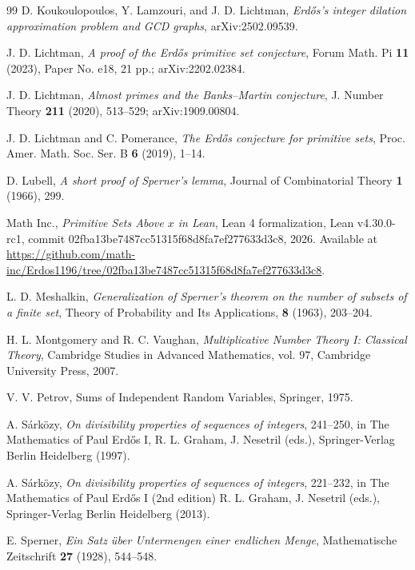 \documentclass[12pt]{amsart}
\theoremstyle{definition}
\theoremstyle{remark}
\numberwithin{equation}{section}
\newcommand{\1}{{\mathbf 1}}
\newcommand{\Erdos}{{Erd\H{o}s}}
\begin{document}
\begin{thebibliography}{99}
D. Koukoulopoulos, Y. Lamzouri, and J. D. Lichtman, \emph{\Erdos{}'s integer dilation approximation problem and GCD graphs}, arXiv:2502.09539.


J. D. Lichtman,
\emph{A proof of the \Erdos{} primitive set conjecture},
Forum Math. Pi \textbf{11} (2023), Paper No. e18, 21 pp.; arXiv:2202.02384.

J. D. Lichtman,
\emph{Almost primes and the Banks--Martin conjecture},
J. Number Theory \textbf{211} (2020), 513--529; arXiv:1909.00804.

J. D. Lichtman and C. Pomerance,
\emph{The \Erdos{} conjecture for primitive sets},
Proc. Amer. Math. Soc. Ser. B \textbf{6} (2019), 1--14.

D. Lubell, \emph{A short proof of Sperner's lemma}, Journal of Combinatorial Theory \textbf{1} (1966), 299.

Math Inc.,
\textit{Primitive Sets Above \(x\) in Lean},
Lean 4 formalization,
Lean v4.30.0-rc1,
commit 02fba13be7487cc51315f68d8fa7ef277633d3c8, 2026.
Available at
\url{https://github.com/math-inc/Erdos1196/tree/02fba13be7487cc51315f68d8fa7ef277633d3c8}.

L. D. Meshalkin, \emph{Generalization of Sperner's theorem on the number of subsets of a finite set}, Theory of Probability and Its Applications, \textbf{8} (1963), 203--204.

H. L. Montgomery and R. C. Vaughan,
\emph{Multiplicative Number Theory I: Classical Theory},
Cambridge Studies in Advanced Mathematics, vol. 97,
Cambridge University Press, 2007.

V. V. Petrov, Sums of Independent Random Variables, Springer, 1975.

A. S\'ark\"ozy, \emph{On divisibility properties of sequences of integers}, 241--250, in The Mathematics of Paul \Erdos{} I, R. L. Graham, J. Nesetril (eds.), Springer-Verlag Berlin Heidelberg (1997). 

A. S\'ark\"ozy, \emph{On divisibility properties of sequences of integers}, 221--232, in The Mathematics of Paul Erd\H{o}s I (2nd edition) R. L. Graham, J. Nesetril (eds.), Springer-Verlag Berlin Heidelberg (2013).

E. Sperner, \emph{Ein Satz \"uber Untermengen einer endlichen Menge}, Mathematische Zeitschrift \textbf{27} (1928), 544--548.


\end{thebibliography}
\end{document}
